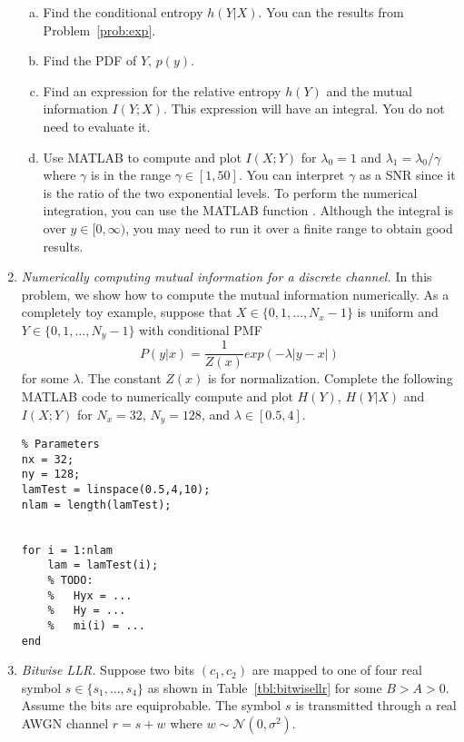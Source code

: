 \documentclass[11pt]{article}
\begin{document}
\begin{enumerate}
\begin{enumerate}[(a)]
\item Find the conditional entropy $h(Y|X)$.  You can the results from Problem~\ref{prob:exp}.

\item Find the PDF of $Y$, $p(y)$.

\item Find an expression for the relative entropy $h(Y)$ and the mutual information $I(Y;X)$.
This expression will have an integral.  You do not need to evaluate it.

\item Use MATLAB to compute and plot $I(X;Y)$ for $\lambda_0=1$ and $\lambda_1 = \lambda_0/\gamma$
where $\gamma$ is in the range $\gamma \in [1,50]$.  You can interpret $\gamma$ as a SNR since it is
the ratio of the two exponential levels.  To perform the numerical integration, you can use the 
MATLAB function . Although the integral is over $y \in [0,\infty)$, you may
need to run it over a finite range to obtain good results.

\end{enumerate}



\item \label{prob:dismi} \emph{Numerically computing mutual information for a discrete channel.}
In this problem, we show how to compute the mutual information numerically.
As a completely toy example, suppose that $X \in \{0,1,\ldots,N_x-1\}$ is uniform
and $Y \in \{0,1,\ldots,N_y-1\}$ with conditional PMF
\[
    P(y|x) = \frac{1}{Z(x)} exp(-\lambda |y-x|)
\]
for some $\lambda$.  The constant $Z(x)$ is for normalization.  
Complete the following MATLAB code to numerically compute and plot $H(Y)$, $H(Y|X)$ and $I(X;Y)$
for  $N_x = 32$, $N_y = 128$, and $\lambda \in [0.5,4]$.    

\begin{lstlisting}
% Parameters
nx = 32;
ny = 128;
lamTest = linspace(0.5,4,10);
nlam = length(lamTest);


for i = 1:nlam
    lam = lamTest(i);
    % TODO:
    %   Hyx = ...
    %   Hy = ...
    %   mi(i) = ...
end
\end{lstlisting}


\item \label{prob:bitwisellr}
\emph{Bitwise LLR.}  Suppose two bits $(c_1,c_2)$ are mapped
to one of four real symbol $s \in \{s_1,\ldots,s_4\}$ as shown in Table~\ref{tbl:bitwisellr} for some $B > A > 0$.  
Assume the bits are equiprobable.  
The symbol $s$ is transmitted through a real AWGN channel $r = s+ w$
where $w \sim {\mathcal N}(0,\sigma^2)$.


\end{enumerate}
\end{document}
